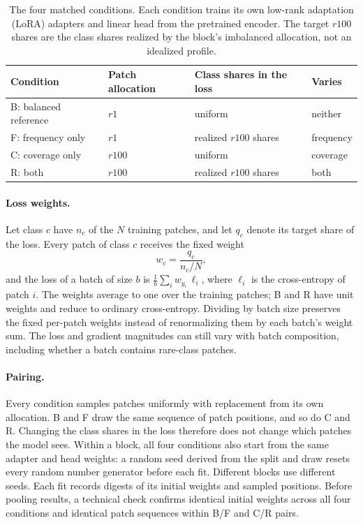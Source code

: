 \documentclass[11pt]{article}
\begin{document}
\begin{table}[htbp]
\centering
\small
\renewcommand{\arraystretch}{1.15}
\begin{tabular}{@{}llll@{}}
\toprule
Condition & Patch allocation & Class shares in the loss & Varies \\
\midrule
B: balanced reference & $r1$ & uniform & neither \\
F: frequency only & $r1$ & realized $r100$ shares & frequency \\
C: coverage only & $r100$ & uniform & coverage \\
R: both & $r100$ & realized $r100$ shares & both \\
\bottomrule
\end{tabular}
\caption{The four matched conditions. Each condition trains its own low-rank adaptation (LoRA) adapters and linear head from the pretrained encoder. The target $r100$ shares are the class shares realized by the block's imbalanced allocation, not an idealized profile.}
\label{tab:arms}
\end{table}

\paragraph{Loss weights.} Let class $c$ have $n_c$ of the $N$ training patches, and let $q_c$ denote its target share of the loss. Every patch of class $c$ receives the fixed weight
\begin{equation}
w_c = \frac{q_c}{n_c / N},
\label{eq:weights}
\end{equation}
and the loss of a batch of size $b$ is $\frac{1}{b}\sum_{i} w_{y_i}\,\ell_i$, where $\ell_i$ is the cross-entropy of patch $i$. The weights average to one over the training patches; B and R have unit weights and reduce to ordinary cross-entropy. Dividing by batch size preserves the fixed per-patch weights instead of renormalizing them by each batch's weight sum. The loss and gradient magnitudes can still vary with batch composition, including whether a batch contains rare-class patches.

\paragraph{Pairing.} Every condition samples patches uniformly with replacement from its own allocation. B and F draw the same sequence of patch positions, and so do C and R. Changing the class shares in the loss therefore does not change which patches the model sees. Within a block, all four conditions also start from the same adapter and head weights: a random seed derived from the split and draw resets every random number generator before each fit. Different blocks use different seeds. Each fit records digests of its initial weights and sampled positions. Before pooling results, a technical check confirms identical initial weights across all four conditions and identical patch sequences within B/F and C/R pairs.
\end{document}
